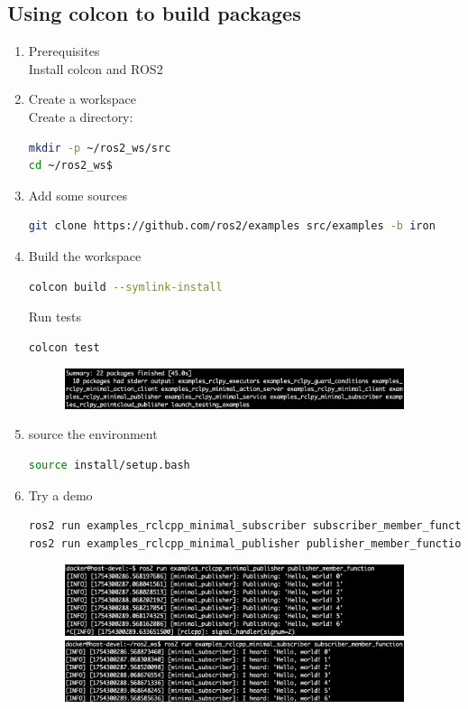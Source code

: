 \documentclass[12pt, a4paper]{article}
\begin{document}
\subsection{Using colcon to build packages}
\begin{enumerate}
	\item Prerequisites\\
Install colcon and ROS2
\item Create a workspace\\
Create a directory:
\begin{lstlisting}[language=bash]
mkdir -p ~/ros2_ws/src
cd ~/ros2_ws$
\end{lstlisting}
\item Add some sources
\begin{lstlisting}[language=bash]
git clone https://github.com/ros2/examples src/examples -b iron
\end{lstlisting}
\item Build the workspace
\begin{lstlisting}[language=bash]
colcon build --symlink-install
\end{lstlisting}
Run tests
\begin{lstlisting}[language=bash]
colcon test
\end{lstlisting}
\begin{figure}[h]
	\setlength{\leftskip}{2.4em}
	\includegraphics[width=0.94\textwidth]{2/p2.1-1}
\end{figure}
\item source the environment
\begin{lstlisting}[language=bash]
source install/setup.bash
\end{lstlisting}

\newpage
\item Try a demo
\begin{lstlisting}[language=bash]
ros2 run examples_rclcpp_minimal_subscriber subscriber_member_function
ros2 run examples_rclcpp_minimal_publisher publisher_member_function
\end{lstlisting}
\begin{figure}[h]
	\setlength{\leftskip}{2.4em}
	\includegraphics[width=0.94\textwidth]{2/p2.1-2}
	\includegraphics[width=0.94\textwidth]{2/p2.1-3}
\end{figure}


\end{enumerate}
\end{document}
